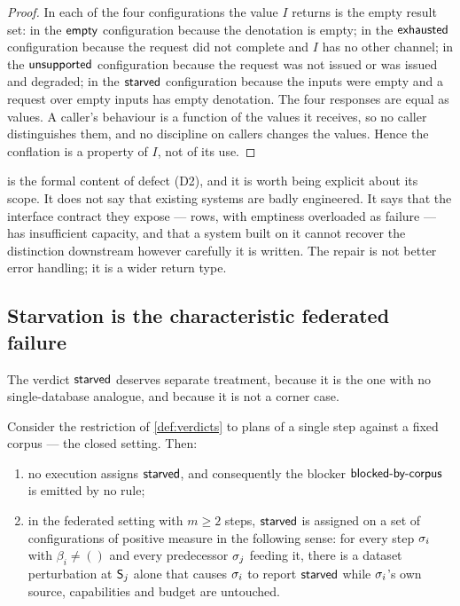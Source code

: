 \begin{proof}
In each of the four configurations the value $I$ returns is the empty result
set: in the $\textsf{empty}$ configuration because the denotation is empty; in the
$\textsf{exhausted}$ configuration because the request did not complete and $I$ has no
other channel; in the $\textsf{unsupported}$ configuration because the request was not issued
or was issued and degraded; in the $\textsf{starved}$ configuration because the inputs
were empty and a request over empty inputs has empty denotation. The four
responses are equal as values. A caller's behaviour is a function of the values
it receives, so no caller distinguishes them, and no discipline on callers
changes the values. Hence the conflation is a property of $I$, not of its use.
\end{proof}

 is the formal content of defect (D2), and it is worth being
explicit about its scope. It does not say that existing systems are badly
engineered. It says that the interface contract they expose --- rows, with
emptiness overloaded as failure --- has insufficient capacity, and that a
system built on it cannot recover the distinction downstream however carefully
it is written. The repair is not better error handling; it is a wider return
type.

\subsection{Starvation is the characteristic federated failure}

The verdict $\textsf{starved}$ deserves separate treatment, because it is the one with
no single-database analogue, and because it is not a corner case.

\begin{proposition}
\label{prop:starve-reachable}
Consider the restriction of \cref{def:verdicts} to plans of a single step
against a fixed corpus --- the closed setting. Then:
\begin{enumerate}[label=(\alph*),leftmargin=2.4em]
\item no execution assigns $\textsf{starved}$, and consequently the blocker $\textsf{blocked-by-corpus}$
is emitted by no rule;
\item in the federated setting with $m \geq 2$ steps, $\textsf{starved}$ is assigned on
a set of configurations of positive measure in the following sense: for every
step $\sigma_i$ with $\beta_i \neq ()$ and every predecessor $\sigma_j$ feeding
it, there is a dataset perturbation at $\mathsf{S}_j$ alone that causes $\sigma_i$ to
report $\textsf{starved}$ while $\sigma_i$'s own source, capabilities and budget are
untouched.
\end{enumerate}
\end{proposition}

